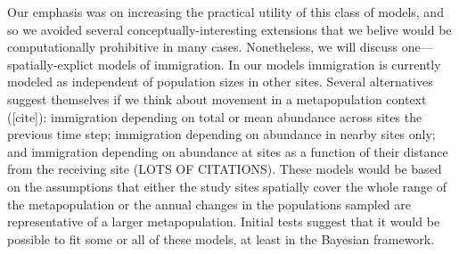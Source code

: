 \documentclass[12pt]{article}
\begin{document}
Our emphasis was on increasing the practical utility of this
class of models, and so we avoided several conceptually-interesting
extensions that we belive would be computationally prohibitive in many
cases. Nonetheless, we will discuss one---spatially-explict models of
immigration. 
In our models immigration is currently modeled as independent of
population sizes in other sites. Several alternatives suggest
themselves if we think about movement in a metapopulation
context ([cite]): immigration depending on total or mean
abundance across sites the previous time step; immigration
depending on abundance in nearby sites only; and immigration
depending on abundance at sites as a function of their distance
from the receiving site (LOTS OF CITATIONS). These models would
be based on the assumptions that either the study sites
spatially cover the whole range of the metapopulation or the
annual changes in the populations sampled are representative of
a larger metapopulation. Initial tests suggest that it would be
possible to fit some or all of these models, at least in the
Bayesian framework.

\end{document}
